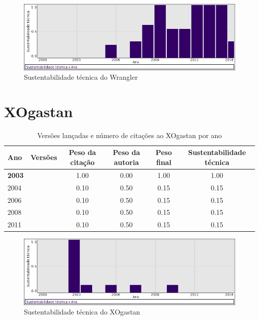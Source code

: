\begin{figure}[h]
  \center
  \includegraphics[scale=0.50]{imagens/softwares-charts/wrangler.png}
  \caption{Sustentabilidade técnica do Wrangler}
\end{figure}


\section{XOgastan}


\begin{table}[H]
\caption{Versões lançadas e número de citações ao XOgastan por ano}
\centering
\begin{tabular}{| l | c | c | c | c | c |}
  \hline
  Ano & Versões & Peso da citação & Peso da autoria & Peso final & Sustentabilidade técnica \\
  \hline
            {\bf 2003}
          &
          
          &
          1.00
          &
          0.00
          &
          1.00
          &
            {\color{blue} 1.00}
          \\
\hline
            2004
          &
          
          &
          0.10
          &
          0.50
          &
          0.15
          &
            {\color{red} 0.15}
          \\
\hline
            2006
          &
          
          &
          0.10
          &
          0.50
          &
          0.15
          &
            {\color{red} 0.15}
          \\
\hline
            2008
          &
          
          &
          0.10
          &
          0.50
          &
          0.15
          &
            {\color{red} 0.15}
          \\
\hline
            2011
          &
          
          &
          0.10
          &
          0.50
          &
          0.15
          &
            {\color{red} 0.15}
          \\
\hline
\end{tabular}
\end{table}

\begin{figure}[h]
  \center
  \includegraphics[scale=0.50]{imagens/softwares-charts/xogastan.png}
  \caption{Sustentabilidade técnica do XOgastan}
\end{figure}



